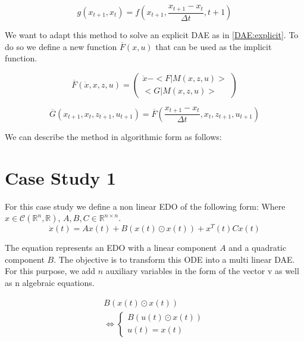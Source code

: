 \documentclass{article}
\begin{document}
{\begin{equation}
    g(x_{t+1}, x_t) = f(x_{t+1}, \frac{x_{t+1}- x_t}{\Delta t}, t+1) 
\end{equation}

We want to adapt this method to solve an explicit DAE as in \ref{DAE:explicit}. To do so we 
define a new function $\overline{F}(x,u)$ that can be used as the implicit function. 

\begin{equation}
    \overline{F}(\dot{x}, x, z, u) =
    \begin{pmatrix}
        \dot{x} - <F|M(x, z, u)> \\
        <G|M(x, z, u)>
    \end{pmatrix} 
\end{equation}

\begin{equation}
    \overline{G}(x_{t+1}, x_{t}, z_{t+1}, u_{t+1}) =  \overline{F}(\frac{x_{t+1}- x_t}{\Delta t}, x_{t}, z_{t+1}, u_{t+1})
\end{equation}

We can describe the method in algorithmic form as follows:



\section{Case Study 1}

For this case study we define a non linear EDO of the following form:
Where $x \in \mathcal{C}(\mathbb{R}^n, \mathbb{R})$, $A, B, C \in \mathbb{R}^{n \times n } $.
\begin{equation}
    \dot{x}(t) = Ax(t) + B(x(t) \odot x(t)) + x^T(t) C x(t)
\end{equation}

The equation represents an EDO with a linear component $A$ and a quadratic component $B$.
The objective is to transform this ODE into a multi linear DAE.
For this purpose, we add $n$ auxiliary variables in the form of the vector v as well as n algebraic equations.

\begin{align}
    B(x(t) \odot x(t)) \\
    \Leftrightarrow \left\{
        \begin{array}{ll}
            B(u(t) \odot x(t)) \\
            u(t) = x(t)
        \end{array}
    \right.
\end{align}

}
\end{document}
